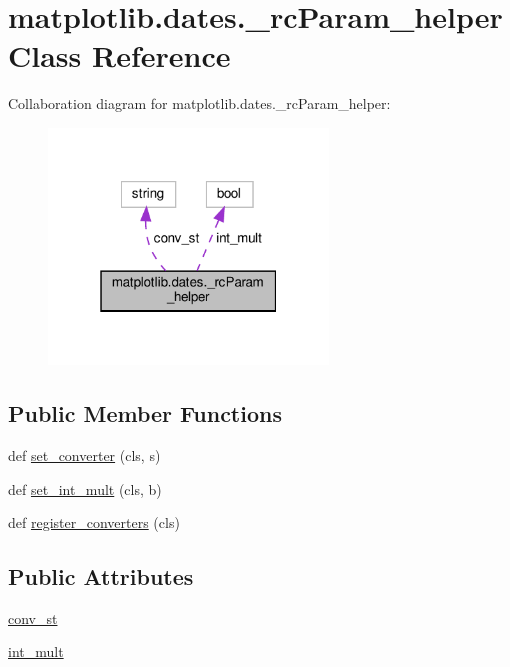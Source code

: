 \hypertarget{classmatplotlib_1_1dates_1_1__rcParam__helper}{}\section{matplotlib.\+dates.\+\_\+rc\+Param\+\_\+helper Class Reference}
\label{classmatplotlib_1_1dates_1_1__rcParam__helper}


Collaboration diagram for matplotlib.\+dates.\+\_\+rc\+Param\+\_\+helper\+:
\nopagebreak
\begin{figure}[H]
\begin{center}
\leavevmode
\includegraphics[width=211pt]{classmatplotlib_1_1dates_1_1__rcParam__helper__coll__graph}
\end{center}
\end{figure}
\subsection*{Public Member Functions}
\begin{DoxyCompactItemize}
\item 
def \hyperlink{classmatplotlib_1_1dates_1_1__rcParam__helper_aa015b257d7d97f5ba6202d80f83df446}{set\+\_\+converter} (cls, s)
\item 
def \hyperlink{classmatplotlib_1_1dates_1_1__rcParam__helper_a5bc489abc1f6087ee78a24214fd5d4de}{set\+\_\+int\+\_\+mult} (cls, b)
\item 
def \hyperlink{classmatplotlib_1_1dates_1_1__rcParam__helper_a91a32fcafabc32786502b84ba6fc551b}{register\+\_\+converters} (cls)
\end{DoxyCompactItemize}
\subsection*{Public Attributes}
\begin{DoxyCompactItemize}
\item 
\hyperlink{classmatplotlib_1_1dates_1_1__rcParam__helper_a206198a98268d6b6832e8b45cc686dcc}{conv\+\_\+st}
\item 
\hyperlink{classmatplotlib_1_1dates_1_1__rcParam__helper_adf63262a6a062bab25370cfe841a4792}{int\+\_\+mult}
\end{DoxyCompactItemize}
